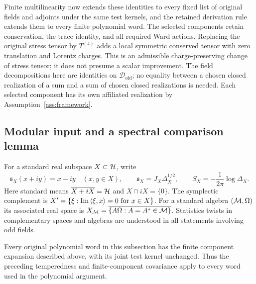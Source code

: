 Finite multilinearity now extends these identities to every fixed list of
original fields and adjoints under the same test kernels, and the retained
derivation rule extends them to every finite polynomial word. The selected
components retain conservation, the trace identity, and all required Ward
actions. Replacing the original stress tensor by $T^{(4)}$ adds a local
symmetric conserved tensor with zero translation and Lorentz charges.
This is an admissible charge-preserving change of stress tensor; it does
not presume a scalar improvement. The field decompositions here are
identities on $\mathcal D_{\mathrm{old}}$; no equality between a chosen
closed realization of a sum and a sum of chosen closed realizations is
needed. Each selected component has its own affiliated realization by
Assumption~\ref{ass:framework}.

\subsection{Modular input and a spectral comparison lemma}
\label{F:modular}

For a standard real subspace $X\subset\mathcal H$, write
\[
 \mathfrak s_X(x+iy)=x-iy\quad(x,y\in X),\qquad
 \mathfrak s_X=J_X\Delta_X^{1/2},\qquad
 S_X=-\frac{1}{2\pi}\log\Delta_X.
\]
Here standard means $\overline{X+iX}=\mathcal H$ and $X\cap iX=\{0\}$.
The symplectic complement is
$X'=\{\xi:\operatorname{Im}\left\langle\xi,x\right\rangle=0\text{ for }x\in X\}$.
For a standard algebra $(\mathcal M,\Omega)$ its associated real space is
$X_\mathcal M=\overline{\{A\Omega:A=A^*\in\mathcal M\}}$.
Statistics twists in complementary spaces and algebras are understood
in all statements involving odd fields.

Every original polynomial word in this subsection has the finite component
expansion described above, with its joint test kernel unchanged. Thus the
preceding temperedness and finite-component covariance apply to every word
used in the polynomial argument.

